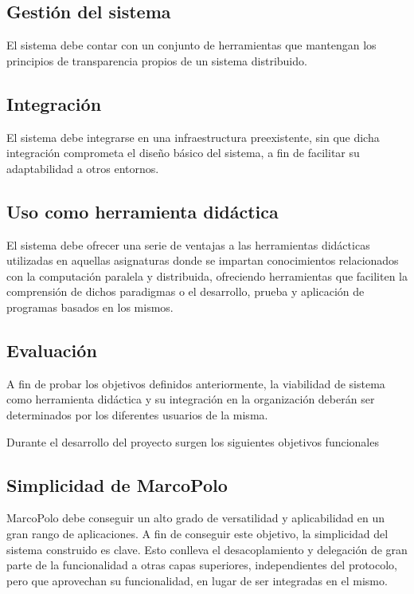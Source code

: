 \subsection{Gestión del sistema}

El sistema debe contar con un conjunto de herramientas que mantengan los principios de transparencia propios de un sistema distribuido.

\subsection{Integración}
El sistema debe integrarse en una infraestructura preexistente, sin que dicha integración comprometa el diseño básico del sistema, a fin de facilitar su adaptabilidad a otros entornos.

\subsection{Uso como herramienta didáctica}
El sistema debe ofrecer una serie de ventajas a las herramientas didácticas utilizadas en aquellas asignaturas donde se impartan conocimientos relacionados con la computación paralela y distribuida, ofreciendo herramientas que faciliten la comprensión de dichos paradigmas o el desarrollo, prueba y aplicación de programas basados en los mismos.

\subsection{Evaluación}

A fin de probar los objetivos definidos anteriormente, la viabilidad de sistema como herramienta didáctica y su integración en la organización deberán ser determinados por los diferentes usuarios de la misma.


Durante el desarrollo del proyecto surgen los siguientes objetivos funcionales

\subsection{Simplicidad de MarcoPolo}

MarcoPolo debe conseguir un alto grado de versatilidad y aplicabilidad en un gran rango de aplicaciones. A fin de conseguir este objetivo, la simplicidad del sistema construido es clave. Esto conlleva el desacoplamiento y delegación de gran parte de la funcionalidad a otras capas superiores, independientes del protocolo, pero que aprovechan su funcionalidad, en lugar de ser integradas en el mismo.

